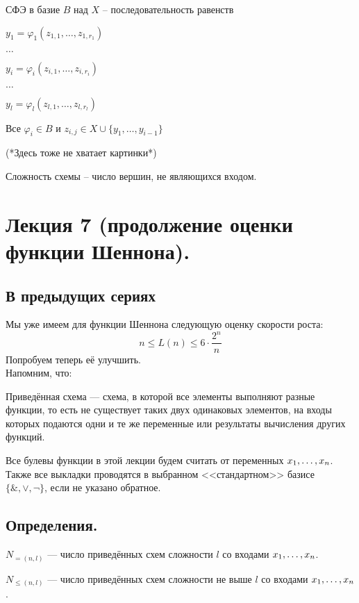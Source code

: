 СФЭ в базие $B$ над $X$ -- последовательность равенств

$y_1 = \varphi_1(z_{1,1}, \ldots, z_{1,r_1})$ 

$ \ldots$

$y_i = \varphi_i(z_{i,1}, \ldots, z_{i,r_i})$ 

$\ldots$

$ y_l = \varphi_l(z_{l,1}, \ldots, z_{l,r_l})$

Все $\varphi_i \in B$ и $z_{i,j} \in X \cup \{y_1, \ldots, y_{i - 1}\}$

(*Здесь тоже не хватает картинки*)

\begin{df}
	Сложность схемы -- число вершин, не являющихся входом.
\end{df}

\section{Лекция 7 (продолжение оценки функции Шеннона).} 
\subsection{В предыдущих сериях}
Мы уже имеем для функции Шеннона следующую оценку скорости роста:
$$n\leq L(n)\leq 6\cdot \frac{2^n}{n}$$
Попробуем теперь её улучшить.\\
Напомним, что:
\begin{df}
Приведённая схема --- схема, в которой все элементы выполняют разные функции, то есть не существует таких двух одинаковых элементов, на входы которых подаются одни и те же переменные или результаты вычисления других функций.
\end{df}
Все булевы функции в этой лекции будем считать от переменных $x_1, \ldots, x_n$. Также все выкладки проводятся в выбранном <<стандартном>> базисе $\{\& ,\vee ,\neg\}$, если не указано обратное.
\subsection{Определения.}
\begin{df}
$N_{=(n,l)}$ --- число приведённых схем сложности $l$ со входами $x_1, \ldots, x_n$.
\end{df}
\begin{df}
$N_{\leq(n,l)}$ --- число приведённых схем сложности не выше $l$ со входами $x_1, \ldots, x_n$.
\end{df}
